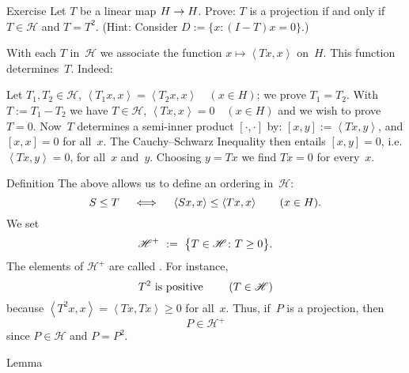 \documentclass[main.tex]{subfiles}
\begin{document}
%
%
\begin{psec}{5.7}{Exercise}
Let $T$ be a linear map $H\rightarrow H$.
Prove: $T$ is a projection
if and only if~$T\in\mathscr H$ and $T=T^2$.
(Hint: Consider $D:=\{x\colon (I-T)x=0\}$.)
\end{psec}
%
%
\begin{psec}{5.8}%
With each $T$ in~$\mathscr H$
we associate the function 
$x\mapsto\left<Tx,x\right>$ on~$H$.
This function determines~$T$.
Indeed:

Let $T_1,T_2\in\mathscr H$,
$\left< T_1 x,x\right> = \left<T_2 x,x\right>\quad (x\in H)$;
we prove $T_1 = T_2$.
With $T:=T_1 - T_2$
we have $T\in\mathscr H$,
$\left< Tx,x\right>=0\quad (x\in H)$
and we wish to prove~$T=0$.
Now~$T$ determines a semi-inner product $[\cdot,\cdot]$
by: $[x,y]:=\left<Tx,y\right>$,
and $[x,x]=0$ for all~$x$.
The Cauchy--Schwarz Inequality then entails $[x,y]=0$,
i.e. $\left<Tx,y\right>=0$, for all~$x$ and~$y$.
Choosing $y=Tx$ we find $Tx=0$ for every~$x$.
\end{psec}
%
%
\begin{psec}{5.9}{Definition}
The above allows us to define an ordering in~$\mathscr H$:
\begin{equation*}
S\leq T\quad \iff \quad
\left<Sx,x\right>\leq \left<Tx,x\right>\qquad (x\in H)\text{.}
\end{equation*}
We set
\begin{equation*}
{\mathscr H}^+ \ :=\ \bigl\{T\in\mathscr H\colon T\geq 0\bigr\}\htam{.}
\end{equation*}
The elements of ${\mathscr H}^+$ are called
.
For instance,
\begin{equation*}
T^2\text{\  is positive }\qquad (T\in\mathscr H)
\end{equation*}
because $\left< T^2 x, x\right> = \left<Tx,Tx\right>\geq 0$
for all~$x$.
Thus,
if~$P$ is a projection,
then
\begin{equation*}
P\in{\mathscr H}^+
\end{equation*}
since $P\in \mathscr H$ and $P=P^2$.
\end{psec}
%
%
\begin{psec}{5.10}{Lemma}\end{psec}
\end{document}
